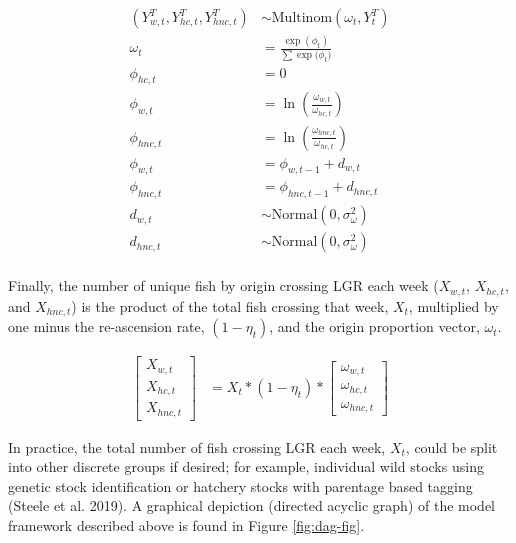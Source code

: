 \documentclass[
  12pt,
]{article}
\begin{document}
\begin{equation}
  \begin{aligned}
    \left( Y^T_{w,t}, Y^T_{hc,t}, Y^T_{hnc,t} \right) &\sim \text{Multinom} \left( \omega_t, Y^T_t \right) \\
    \omega_t &= \frac{\exp(\phi_t)}{\sum{\exp(\phi_t})} \\
    \phi_{hc,t} &= 0 \\
    \phi_{w,t} &= \ln \left( \frac{\omega_{w,t}}{\omega_{hc,t}} \right) \\
    \phi_{hnc,t} &= \ln \left( \frac{\omega_{hnc,t}}{\omega_{hc,t}} \right) \\
    \phi_{w,t} &= \phi_{w, t-1} + d_{w,t} \\
    \phi_{hnc,t} &= \phi_{hnc, t-1} + d_{hnc,t} \\
    d_{w,t} &\sim \text{Normal}(0, \sigma^2_\omega) \\
    d_{hnc,t} &\sim \text{Normal}(0, \sigma^2_\omega) \\
  \end{aligned}
\end{equation}

Finally, the number of unique fish by origin crossing LGR each week (\(X_{w,t}\), \(X_{hc,t}\), and \(X_{hnc,t}\)) is the product of the total fish crossing that week, \(X_t\), multiplied by one minus the re-ascension rate, \((1 - \eta_t)\), and the origin proportion vector, \(\omega_t\).

\begin{equation}
  \begin{aligned}
    \begin{bmatrix} X_{w,t} \\ X_{hc,t} \\ X_{hnc,t} \end{bmatrix}
    &= X_t * (1 - \eta_t) * \begin{bmatrix} \omega_{w,t} \\ \omega_{hc,t} \\ \omega_{hnc,t} \end{bmatrix}
  \end{aligned}
\end{equation}

In practice, the total number of fish crossing LGR each week, \(X_t\), could be split into other discrete groups if desired; for example, individual wild stocks using genetic stock identification or hatchery stocks with parentage based tagging (Steele et al. 2019). A graphical depiction (directed acyclic graph) of the model framework described above is found in Figure \ref{fig:dag-fig}.
\end{document}
